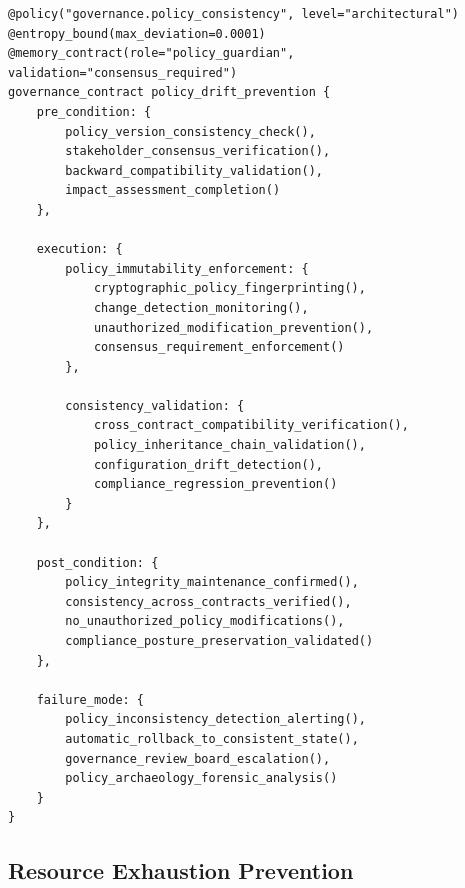 \documentclass[11pt,letterpaper]{article}
\begin{document}
\begin{lstlisting}[language=rift, caption=Policy Consistency Enforcement Pattern]
@policy("governance.policy_consistency", level="architectural")
@entropy_bound(max_deviation=0.0001)
@memory_contract(role="policy_guardian", validation="consensus_required")
governance_contract policy_drift_prevention {
    pre_condition: {
        policy_version_consistency_check(),
        stakeholder_consensus_verification(),
        backward_compatibility_validation(),
        impact_assessment_completion()
    },
    
    execution: {
        policy_immutability_enforcement: {
            cryptographic_policy_fingerprinting(),
            change_detection_monitoring(),
            unauthorized_modification_prevention(),
            consensus_requirement_enforcement()
        },
        
        consistency_validation: {
            cross_contract_compatibility_verification(),
            policy_inheritance_chain_validation(),
            configuration_drift_detection(),
            compliance_regression_prevention()
        }
    },
    
    post_condition: {
        policy_integrity_maintenance_confirmed(),
        consistency_across_contracts_verified(),
        no_unauthorized_policy_modifications(),
        compliance_posture_preservation_validated()
    },
    
    failure_mode: {
        policy_inconsistency_detection_alerting(),
        automatic_rollback_to_consistent_state(),
        governance_review_board_escalation(),
        policy_archaeology_forensic_analysis()
    }
}
\end{lstlisting}

\subsection{Resource Exhaustion Prevention}
\end{document}

